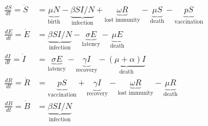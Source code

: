 \begin{align*}

\frac{dS}{dt} = \dot{S}  &= \underbrace{\mu N}_\textrm{birth} - \underbrace{\beta S I / N}_\textrm{infection} + \underbrace{\omega R}_\textrm{lost immunity} - \underbrace{ \mu S}_\text{death} - \underbrace{p S}_\text{vaccination} 

\\

\frac{dE}{dt} = \dot{E} &=  \underbrace{\beta S I / N}_\textrm{infection} - \underbrace{\sigma E}_\textrm{latency} - \underbrace{\mu E}_\text{death}

\\

\frac{dI}{dt} = \dot{I} &=  \underbrace{\sigma E}_\textrm{latency} - \underbrace{\gamma I}_\text{recovery} - \underbrace{(\mu + \alpha)I}_\text{death}

\\

\frac{dR}{dt} = \dot{R} &= \underbrace{p S}_\textrm{vaccination} + \underbrace{\gamma I}_\textrm{recovery} - \underbrace{\omega R}_\textrm{lost immunity}  - \underbrace{\mu R}_\textrm{death}

\\

\frac{dB}{dt} = \dot{B} &= \underbrace{\beta S I / N}_\textrm{infection}

\end{align*}

